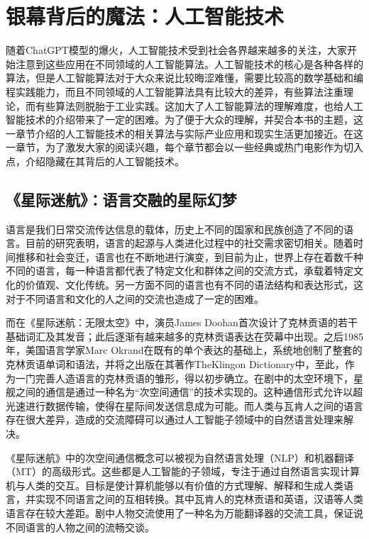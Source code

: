 \setchapterpreamble[u]{\margintoc}
\chapter[银幕背后的魔法：人工智能技术]{银幕背后的魔法：人工智能技术\footnotemark[0]}


随着ChatGPT模型的爆火，人工智能技术受到社会各界越来越多的关注，大家开始注意到这些应用在不同领域的人工智能算法。人工智能技术的核心是各种各样的算法，但是人工智能算法对于大众来说比较晦涩难懂，需要比较高的数学基础和编程实践能力，而且不同领域的人工智能算法具有比较大的差异，有些算法注重理论，而有些算法则脱胎于工业实践。这加大了人工智能算法的理解难度，也给人工智能技术的介绍带来了一定的困难。为了便于大众的理解，并契合本书的主题，这一章节介绍的人工智能技术的相关算法与实际产业应用和现实生活更加接近。在这一章节，为了激发大家的阅读兴趣，每个章节都会以一些经典或热门电影作为切入点，介绍隐藏在其背后的人工智能技术。

\section{《星际迷航》：语言交融的星际幻梦}

语言是我们日常交流传达信息的载体，历史上不同的国家和民族创造了不同的语言。目前的研究表明，语言的起源与人类进化过程中的社交需求密切相关。随着时间推移和社会变迁，语言也在不断地进行演变，到目前为止，世界上存在着数千种不同的语言，每一种语言都代表了特定文化和群体之间的交流方式，承载着特定文化的价值观、文化传统。另一方面不同的语言也有不同的语法结构和表达形式，这对于不同语言和文化的人之间的交流也造成了一定的困难。

而在《星际迷航：无限太空》中，演员James Doohan首次设计了克林贡语的若干基础词汇及其发音；此后逐渐有越来越多的克林贡语表达在荧幕中出现。之后1985年，美国语言学家Marc Okrand在既有的单个表达的基础上，系统地创制了整套的克林贡语单词和语法，并将之出版在其著作TheKlingon Dictionary中，至此，作为一门完善人造语言的克林贡语的雏形，得以初步确立。在剧中的太空环境下，星舰之间的通信是通过一种名为“次空间通信”的技术实现的。这种通信形式允许以超光速进行数据传输，使得在星际间发送信息成为可能。而人类与瓦肯人之间的语言存在很大差异，造成的交流障碍可以通过人工智能子领域中的自然语言处理来解决。

《星际迷航》中的次空间通信概念可以被视为自然语言处理（NLP）和机器翻译（MT）的高级形式。这些都是人工智能的子领域，专注于通过自然语言实现计算机与人类的交互。目标是使计算机能够以有价值的方式理解、解释和生成人类语言，并实现不同语言之间的互相转换。其中瓦肯人的克林贡语和英语，汉语等人类语言存在较大差距。剧中人物交流使用了一种名为万能翻译器的交流工具，保证说不同语言的人物之间的流畅交谈。

